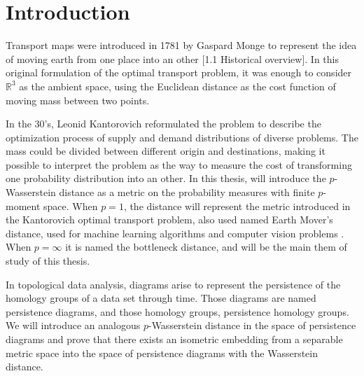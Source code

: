 \section{Introduction}

Transport maps were introduced in 1781 by Gaspard Monge to represent the idea of moving earth from one place into an other \cite{Figalli}[1.1 Historical overview]. In this original formulation of the optimal transport problem, it was enough to consider $ \mathbb R^3 $ as the ambient space, using the Euclidean distance as the cost function of moving mass between two points.

In the 30's, Leonid Kantorovich reformulated the problem to describe the optimization process of supply and demand distributions of diverse problems. The mass could be divided between different origin and destinations, making it possible to interpret the problem as the way to measure the cost of transforming one probability distribution into an other. In this thesis, will introduce the $p$-Wasserstein distance as a metric on the probability measures with finite $p$-moment space. When $ p = 1 $, the distance will represent the metric introduced in the Kantorovich optimal transport problem, also used named Earth Mover's distance, used for machine learning algorithms and computer vision problems \cite{earth}. When $p = \infty $ it is named the bottleneck distance, and will be the main them of study of this thesis.

In topological data analysis, diagrams arise to represent the 
persistence of the homology groups of a data set through time. Those diagrams are named persistence diagrams, and those homology groups, persistence homology groups. We will introduce an analogous $p$-Wasserstein distance in the space of persistence diagrams and prove that there exists an isometric embedding  from a separable metric space into the space of persistence diagrams with the Wasserstein distance.